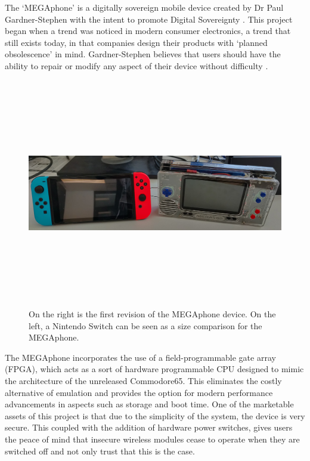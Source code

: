 The ‘MEGAphone’ is a digitally sovereign mobile device created by Dr Paul Gardner-Stephen with the intent to promote Digital Sovereignty \cite{mobilehistory}.
This project began when a trend was noticed in modern consumer electronics, a trend that still exists today, in that companies design their products with ‘planned obsolescence’ in mind.
Gardner-Stephen believes that users should have the ability to repair or modify any aspect of their device without difficulty \cite{mobilehistory}.

\begin{figure} [h]
    \centering
    \includegraphics[width=12cm,height=10cm,keepaspectratio]{Figures/megaphone.png}
    \caption{On the right is the first revision of the MEGAphone device. On the left, a Nintendo Switch \cite{nintendoswitch} can be seen as a size comparison for the MEGAphone.}
    \label{fig:Jellybean}
\end{figure}

The MEGAphone incorporates the use of a field-programmable gate array (FPGA), which acts as a sort of hardware programmable CPU designed to mimic the architecture of the unreleased Commodore65.
This eliminates the costly alternative of emulation and provides the option for modern performance advancements in aspects such as storage and boot time.
One of the marketable assets of this project is that due to the simplicity of the system, the device is very secure.
This coupled with the addition of hardware power switches, gives users the peace of mind that insecure wireless modules cease to operate when they are switched off and not only trust that this is the case.

